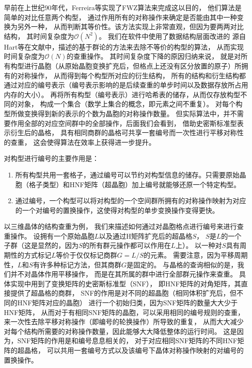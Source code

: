 早前在上世纪90年代，Ferreira等\cite{ferreira1991stability}实现了FWZ算法来完成这以目的，
他们算法是简单的对比任意两个构型，
通过作用所有的对称操作来确定是否能由其中一种变换为另外一种，
从而判断其等价性。该方法实现上非常直观，但因为要两两对比结构，
其时间复杂度为$\mathcal{O}(N^2)$。
我们在软件中使用了数据结构层面改进的
源自Hart等在文献\cite{hart2008algorithm}中，描述的基于群论的方法来去除不等价的构型的算法，
从而实现时间复杂度为$\mathcal{O}(N)$的查重操作。
其时间复杂度下降的原因归纳来说，
就是对所有构型进行晶胞（从原始晶胞变换扩充后，但格点上还没有区分放置的原子）所拥有的对称操作，
从而得到每个构型所对应的衍生结构，
所有的结构和衍生结构都通过对应的编号表示（编号表示影响的是后续查重的单步时间以及数据存放所占用内存的大小）。
再将所有构型（编号表示）进行哈希表的储存，从而仅存放构型不同的对象，
构成一个集合（数学上集合的概念，即元素之间不重复）。
对每个构型所做变换得到新的表示的个数为晶胞的对称操作数量。
但实际算法中，并不需要作用全部的对应空间群中的全部操作，后面我们会看到，
借助史密斯标准型表示衍生后的晶格，
具有相同商群的晶格可共享一套编号而一次性进行平移对称性的查重，
这会使得算法在效率上获得进一步提升。

对构型进行编号的主要作用是：
\begin{enumerate}
  \item 所有构型共用一套格子，通过编号可以节约对构型信息的储存。只需要原始晶胞（格子类型）和HNF矩阵（超晶胞）加上编号就能够还原一个特定构型。
  \item 通过编号，一个构型可以将对构型的一个空间群所拥有的对称操作映射为对应的一个对编号的置换操作，这使得对构型的单步变换操作变得更快。
\end{enumerate}

以三维晶体的结构查重为例，
我们来描述如何通过对晶胞格点进行编号来进行查重操作。
设拥有一个原始晶胞$L$以及通过H矩阵扩充后的超晶格$S$，
$S$是$L$的一个子群（这是显然的，因为$S$的所有群元操作都可以作用在$L$上）。
以一种对$S$具有周期性的方式标记$L$等价于仅仅标记商群$G=L/S$的元素。
需要注意，因为平移周期性，$L$和$S$有许多种标记方法，但其商群$G$是固定的。
与晶格的查询相似的是，我们并不对晶体作用平移操作，
而是在其所属的群中进行全部群元操作来查重。
具体实现中用到了变换矩阵的史密斯标准型（SNF），
即HNF矩阵的对角矩阵，其直接提供了超晶格的商群，
SNF的作用是对不同的超晶胞（相同体积扩充后，但不同的HNF矩阵对应的晶胞）
进行一个初始归类，因为SNF矩阵的数量大大少于HNF矩阵，
从而对于有相同SNF矩阵的晶胞，可以采用相同的编号规则的查重，
来一次性去除平移对称操作（即编号的轮换操作）所导致的重复，
从而大大减少对每个结构所需要的对称操作数量，因此能够大大降低整体的运行时间。
这是因为，SNF矩阵的作用是和编号息息相关的，
对于对应相同SNF矩阵的不同HNF矩阵的超晶格，
可以共用一套编号方式以及该编号下晶体对称操作映射的对编号的置换操作。

